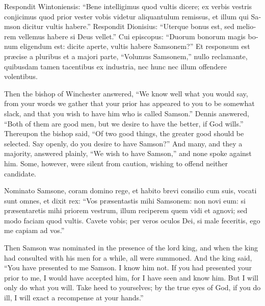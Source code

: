 \documentclass[10pt]{book}
\begin{document}
\begin{paracol}{2}
\switchcolumn*

\begin{otherlanguage}{latin}
Respondit Wintoniensis: ``Bene intelligimus quod vultis dicere; ex verbis vestris conjicimus quod prior vester vobis videtur aliquantulum remissus, et illum qui Samson dicitur vultis habere.'' Respondit Dionisius: ``Uterque bonus est, sed meliorem vellemus habere si Deus vellet.'' Cui episcopus: ``Duorum bonorum magis bonum eligendum est: dicite aperte, vultis habere Samsonem?'' Et responsum est pr\ae{}cise a pluribus et a majori parte, ``Volumus Samsonem,'' nullo reclamante, quibusdam tamen tacentibus ex industria, nec hunc nec illum offendere volentibus.
\end{otherlanguage}

\switchcolumn

Then the bishop of Winchester answered, ``We know well what you would say, from your words we gather that your prior has appeared to you to be somewhat slack, and that you wish to have him who is called Samson.'' Dennis answered, ``Both of them are good men, but we desire to have the better, if God wills.'' Thereupon the bishop said, ``Of two good things, the greater good should be selected. Say openly, do you desire to have Samson?'' And many, and they a majority, answered plainly, ``We wish to have Samson,'' and none spoke against him. Some, however, were silent from caution, wishing to offend neither candidate.

\switchcolumn*

\begin{otherlanguage}{latin}
Nominato Samsone, coram domino rege, et habito brevi consilio cum suis, vocati sunt omnes, et dixit rex: ``Vos pr\ae{}sentastis mihi Samsonem: non novi eum: si pr\ae{}sentaretis mihi priorem vestrum, illum reciperem quem vidi et agnovi; sed modo faciam quod vultis. Cavete vobis; per veros oculos Dei, si male feceritis, ego me capiam ad vos.''
\end{otherlanguage}

\switchcolumn

Then Samson was nominated in the presence of the lord king, and when the king had consulted with his men for a while, all were summoned. And the king said, ``You have presented to me Samson. I know him not. If you had presented your prior to me, I would have accepted him, for I have seen and know him. But I will only do what you will. Take heed to yourselves; by the true eyes of God, if you do ill, I will exact a recompense at your hands.''


\end{paracol}
\end{document}
